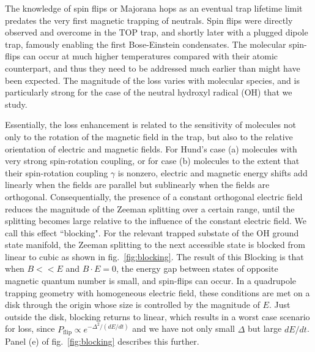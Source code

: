 \documentclass[%
 reprint,
 amsmath,amssymb,
 aps,
prl,
]{revtex4-1}
\begin{document}
The knowledge of spin flips or Majorana hops as an eventual trap lifetime limit predates the very first magnetic trapping of neutrals\cite{Migdall1985}. Spin flips were directly observed and overcome in the TOP trap\cite{Petrich1995}, and shortly later with a plugged dipole trap\cite{Davis1995}, famously enabling the first Bose-Einstein condensates. The molecular spin-flips can occur at much higher temperatures compared with their atomic counterpart, and thus they need to be addressed much earlier than might have been expected. The magnitude of the loss varies with molecular species, and is particularly strong for the case of the neutral hydroxyl radical (OH) that we study. 

Essentially, the loss enhancement is related to the sensitivity of molecules not only to the rotation of the magnetic field in the trap, but also to the relative orientation of electric and magnetic fields. For Hund's case (a) molecules with very strong spin-rotation coupling, or for case (b) molecules to the extent that their spin-rotation coupling $\gamma$ is nonzero, electric and magnetic energy shifts add linearly when the fields are parallel but sublinearly when the fields are orthogonal. Consequentially, the presence of a constant orthogonal electric field reduces the magnitude of the Zeeman splitting over a certain range, until the splitting becomes large relative to the influence of the constant electric field. We call this effect ``blocking". For the relevant trapped substate of the OH ground state manifold, the Zeeman splitting to the next accessible state is blocked from linear to cubic as shown in fig.~\ref{fig:blocking}.  The result of this Blocking is that when $B<<E$ and $B\cdot E=0$, the energy gap between states of opposite magnetic quantum number is small, and spin-flips can occur. In a quadrupole trapping geometry with homogeneous electric field, these conditions are met on a disk through the origin whose size is controlled by the magnitude of $E$. Just outside the disk, blocking returns to linear, which results in a worst case scenario for loss, since $P_{\text{flip}}\propto e^{-\Delta^2/(dE/dt)}$ and we have not only small $\Delta$ but large $dE/dt$. Panel (e) of fig.~\ref{fig:blocking} describes this further.
\end{document}
